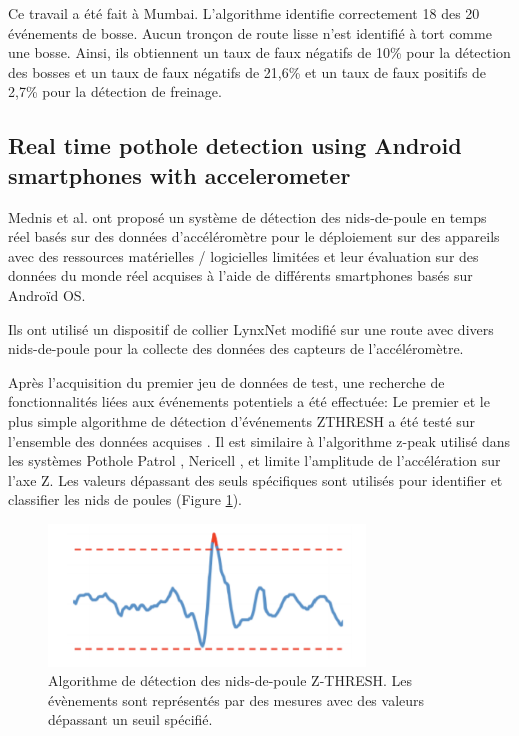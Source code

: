 Ce travail a été fait à Mumbai. L'algorithme identifie correctement 18 des 20 événements de bosse. Aucun tronçon de route lisse n'est identifié à tort comme une bosse. Ainsi, ils obtiennent un taux de faux négatifs de 10\% pour la détection des bosses et un taux de faux négatifs de 21,6\% et un taux de faux positifs de 2,7\% pour la détection de freinage.

\subsection{Real time pothole detection using Android smartphones with accelerometer}
Mednis et al. ont proposé un système de détection des nids-de-poule en temps réel basés sur des données d'accéléromètre pour le déploiement sur des appareils avec des ressources matérielles / logicielles limitées et leur évaluation sur des données du monde réel acquises à l'aide de différents smartphones basés sur Androïd OS.

Ils ont utilisé un dispositif de collier LynxNet modifié \cite{zviedrisLynxNetWildAnimal2010} sur une route avec divers nids-de-poule pour la collecte des données des capteurs de l'accéléromètre.

Après l'acquisition du premier jeu de données de test, une recherche de fonctionnalités liées aux événements potentiels a été effectuée: Le premier et le plus simple algorithme de détection d'événements ZTHRESH a été testé sur l'ensemble des données acquises . Il est similaire à l'algorithme z-peak utilisé dans les systèmes Pothole Patrol \cite{PotholePatrolProceedings}, Nericell \cite{mohanNericellUsingMobile2008}, et limite l'amplitude de l'accélération sur l'axe Z. Les valeurs dépassant des seuls spécifiques sont utilisés pour identifier et classifier les nids de poules (Figure \ref{fig:graph_Z_THRESH}). 

\begin{figure}[h!]
  \center
  \includegraphics[width=0.75\textwidth]{Images/chapter2/relatedWork3.PNG}
  \caption{Algorithme de détection des nids-de-poule Z-THRESH. Les évènements sont représentés par des mesures avec des valeurs dépassant un seuil spécifié.}
  \label{fig:graph_Z_THRESH}
\end{figure}


